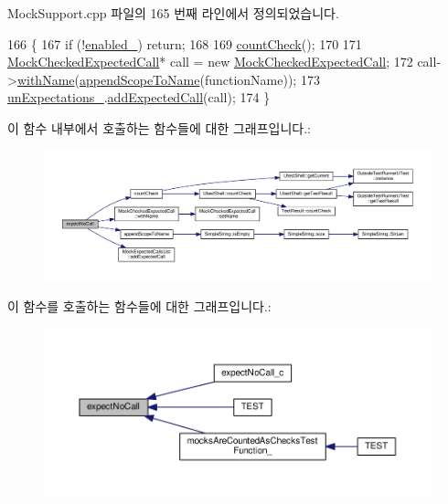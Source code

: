 Mock\+Support.\+cpp 파일의 165 번째 라인에서 정의되었습니다.


\begin{DoxyCode}
166 \{
167     \textcolor{keywordflow}{if} (!\hyperlink{class_mock_support_ab6dfcb3e6c79f4def1295fea7f0de8c0}{enabled\_}) \textcolor{keywordflow}{return};
168 
169     \hyperlink{class_mock_support_a58577489a2418efb4c440761e533f2e7}{countCheck}();
170 
171     \hyperlink{class_mock_checked_expected_call}{MockCheckedExpectedCall}* call = \textcolor{keyword}{new} 
      \hyperlink{class_mock_checked_expected_call}{MockCheckedExpectedCall};
172     call->\hyperlink{class_mock_checked_expected_call_a956e88393edbb7f7427eecb56ac5e317}{withName}(\hyperlink{class_mock_support_a42be7089fa18ff37b9d04b4caae95133}{appendScopeToName}(functionName));
173     \hyperlink{class_mock_support_a4a55b86a3e9c4570ce32185e5798454e}{unExpectations\_}.\hyperlink{class_mock_expected_calls_list_a93aa2234c01260b1e76ceef59f8cfaee}{addExpectedCall}(call);
174 \}
\end{DoxyCode}


이 함수 내부에서 호출하는 함수들에 대한 그래프입니다.\+:
\nopagebreak
\begin{figure}[H]
\begin{center}
\leavevmode
\includegraphics[width=350pt]{class_mock_support_a22667fe15401f19b7a477b06ae172271_cgraph}
\end{center}
\end{figure}




이 함수를 호출하는 함수들에 대한 그래프입니다.\+:
\nopagebreak
\begin{figure}[H]
\begin{center}
\leavevmode
\includegraphics[width=350pt]{class_mock_support_a22667fe15401f19b7a477b06ae172271_icgraph}
\end{center}
\end{figure}


